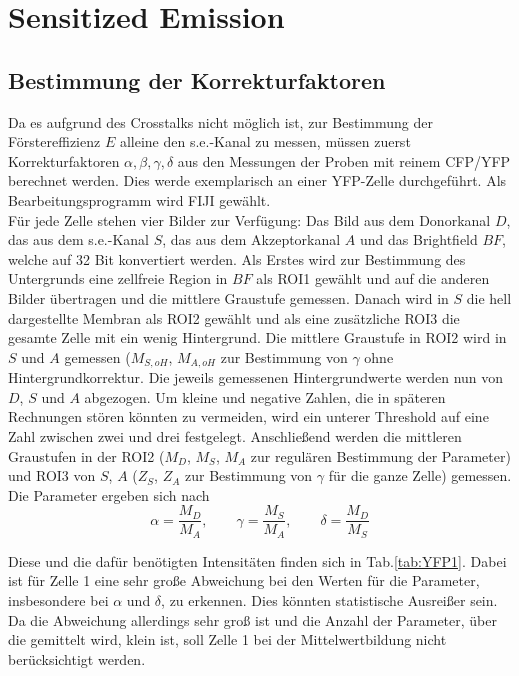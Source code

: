 

\section{Sensitized Emission}
\label{sec:SE}

\subsection{Bestimmung der Korrekturfaktoren}
\label{subs:korr}

Da es aufgrund des Crosstalks nicht möglich ist, zur Bestimmung der Förstereffizienz $E$ alleine den s.e.-Kanal zu messen, müssen zuerst 
Korrekturfaktoren $\alpha, \beta, \gamma, \delta$ aus den Messungen der Proben mit reinem CFP/YFP berechnet werden.
Dies werde exemplarisch an einer YFP-Zelle durchgeführt. Als Bearbeitungsprogramm wird FIJI gewählt. \footnotemark 
{}
\\
Für jede Zelle stehen vier Bilder zur Verfügung: Das Bild aus dem Donorkanal $D$, das aus dem s.e.-Kanal $S$, das aus dem 
Akzeptorkanal $A$ und das Brightfield $BF$, welche auf 32 Bit konvertiert werden. 
Als Erstes wird zur Bestimmung des Untergrunds eine zellfreie Region in $BF$ als ROI1 gewählt und 
auf die anderen Bilder übertragen und die mittlere Graustufe gemessen. Danach wird in $S$ die hell dargestellte Membran als ROI2 gewählt und 
als eine zusätzliche ROI3 die gesamte Zelle mit ein wenig Hintergrund. Die mittlere Graustufe in ROI2 wird in $S$ und $A$ gemessen 
($M_{S,oH}$, $M_{A,oH}$ zur 
Bestimmung von $\gamma$ ohne Hintergrundkorrektur. Die jeweils gemessenen Hintergrundwerte werden nun von $D$, $S$ und $A$ abgezogen. 
Um kleine und negative Zahlen, die in späteren Rechnungen stören könnten zu vermeiden, wird ein unterer Threshold auf eine Zahl zwischen 
zwei und drei festgelegt. Anschließend werden die mittleren Graustufen in der ROI2 ($M_D$, $M_S$, $M_A$ zur regulären Bestimmung 
der Parameter) und ROI3 von $S$, $A$ ($Z_S$, $Z_A$ zur Bestimmung von $\gamma$ für die ganze Zelle) gemessen. Die Parameter ergeben 
sich nach
\begin{equation*}
    \alpha = \frac{M_D}{M_A}, \qquad
    \gamma = \frac{M_S}{M_A}, \qquad
    \delta = \frac{M_D}{M_S}
\end{equation*}

Diese und die dafür benötigten Intensitäten finden sich in Tab.\ref{tab:YFP1}. Dabei ist für Zelle 1 eine sehr große Abweichung bei den 
Werten für die Parameter, insbesondere bei $\alpha$ und $\delta$, zu erkennen. Dies könnten statistische Ausreißer sein. Da die Abweichung 
allerdings sehr groß ist und die Anzahl der Parameter, über die gemittelt wird, klein ist, soll Zelle 1 bei der Mittelwertbildung 
nicht berücksichtigt werden.

